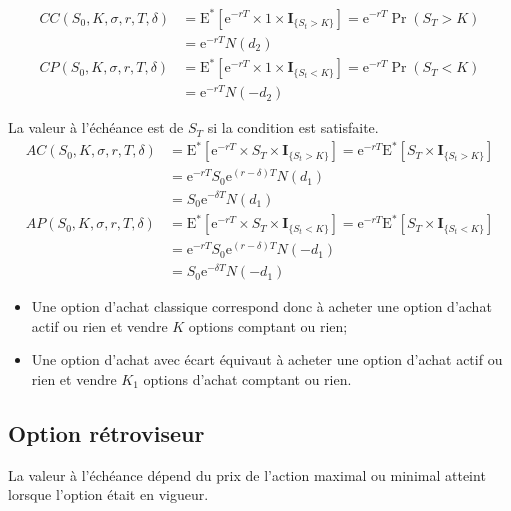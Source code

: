 \documentclass[10pt, french]{article}
\begin{document}
\begin{multicols*}{2}
\begin{definitionNOHFILLsub}
\begin{align*}
	CC(S_{0}, K, \sigma, r, T, \delta)
	&=	\text{E}^{*}[\textrm{e}^{-rT} \times 1	\times	\bm{I}_{\{S_{t}	>	K\}}]
	=	\textrm{e}^{-rT} \Pr(S_{T}	>	K)	\\
	&=	\textrm{e}^{-rT} N(d_{2})	\\
	CP(S_{0}, K, \sigma, r, T, \delta)
	&=	\text{E}^{*}[\textrm{e}^{-rT} \times	1	\times	\bm{I}_{\{S_{t}	<	K\}}]
	=	\textrm{e}^{-rT} \Pr(S_{T}	<	K)	\\
	&=	\textrm{e}^{-rT} N(-d_{2})	
\end{align*}
\end{definitionNOHFILLsub}

\begin{definitionNOHFILLsub}
La valeur à l'échéance est de $S_{T}$ si la condition est satisfaite.\\

\begin{align*}
	AC(S_{0}, K, \sigma, r, T, \delta)
	&=	\text{E}^{*}[\textrm{e}^{-rT} \times S_{T}	\times	\bm{I}_{\{S_{t}	>	K\}}]	
	=	\textrm{e}^{-rT} \text{E}^{*}[S_{T}	\times	\bm{I}_{\{S_{t}	>	K\}}]	\\
	&=	\textrm{e}^{-rT} S_{0} \textrm{e}^{(r	-	\delta)T}N(d_{1})	\\
	&=	S_{0} \textrm{e}^{-\delta T}N(d_{1})	\\
	AP(S_{0}, K, \sigma, r, T, \delta)
	&=	\text{E}^{*}[\textrm{e}^{-rT} \times S_{T}	\times	\bm{I}_{\{S_{t}	<	K\}}]	
	=	\textrm{e}^{-rT} \text{E}^{*}[S_{T}	\times	\bm{I}_{\{S_{t}	<	K\}}]	\\
	&=	\textrm{e}^{-rT} S_{0} \textrm{e}^{(r	-	\delta)T}N(-d_{1})	\\
	&=	S_{0} \textrm{e}^{-\delta T}N(-d_{1})	
\end{align*}
\end{definitionNOHFILLsub}

\begin{itemize}
	\item	Une option d'achat classique correspond donc à acheter une option d'achat actif ou rien et vendre $K$ options comptant ou rien;
	\item	Une option d'achat avec écart équivaut à acheter une option d'achat actif ou rien et vendre $K_{1}$ options d'achat comptant ou rien.
\end{itemize}

\columnbreak
\subsection*{Option rétroviseur}
\begin{definitionNOHFILL}
La valeur à l'échéance dépend du prix de l'action maximal ou minimal atteint lorsque l'option était en vigueur.\\


\end{definitionNOHFILL}
\end{multicols*}
\end{document}
